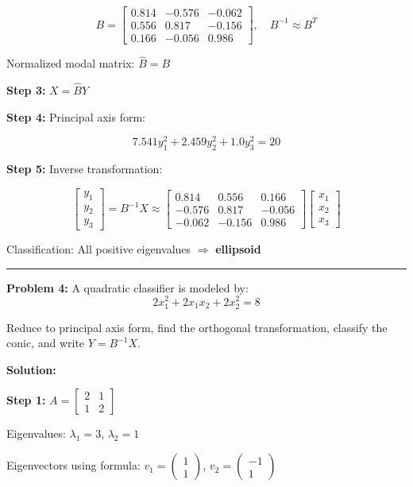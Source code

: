 \documentclass[
  letterpaper,
  DIV=11,
  numbers=noendperiod]{scrreprt}
\begin{document}
\[
B = 
\begin{bmatrix}
0.814 & -0.576 & -0.062\\
0.556 & 0.817 & -0.156\\
0.166 & -0.056 & 0.986
\end{bmatrix}, \quad B^{-1} \approx B^T
\]

Normalized modal matrix: \(\hat{B} = B\)

\textbf{Step 3:} \(X = \hat{B}Y\)

\textbf{Step 4:} Principal axis form:

\[
7.541 y_1^2 + 2.459 y_2^2 + 1.0 y_3^2 = 20
\]

\textbf{Step 5:} Inverse transformation:

\[
\begin{bmatrix}y_1\\y_2\\y_3\end{bmatrix} = 
B^{-1} X \approx
\begin{bmatrix}
0.814 & 0.556 & 0.166\\
-0.576 & 0.817 & -0.056\\
-0.062 & -0.156 & 0.986
\end{bmatrix}
\begin{bmatrix}x_1\\x_2\\x_3\end{bmatrix}
\]

Classification: All positive eigenvalues \(\Rightarrow\)
\textbf{ellipsoid}

\begin{center}\rule{0.5\linewidth}{0.5pt}\end{center}

\textbf{Problem 4:} A quadratic classifier is modeled by: \[
2x_1^{2}+2x_1x_2+2x_2^{2}=8
\]

Reduce to principal axis form, find the orthogonal transformation,
classify the conic, and write \(Y=B^{-1}X\).

\textbf{Solution:}

\textbf{Step 1:} \(A = \begin{bmatrix}2 & 1\\1 & 2\end{bmatrix}\)

Eigenvalues: \(\lambda_1 = 3\), \(\lambda_2 = 1\)

Eigenvectors using formula: \(v_1 = \begin{pmatrix}1\\1\end{pmatrix}\),
\(v_2 = \begin{pmatrix}-1\\1\end{pmatrix}\)
\end{document}
